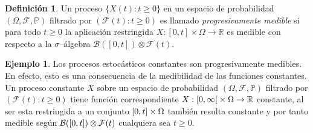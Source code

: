 \documentclass{report}
\newcommand{\leftOpenInterval}{\left]}
\newcommand{\rightOpenInterval}{\right[}
\newcommand{\leftClosedInterval}{\left[}
\newcommand{\rightClosedInterval}{\right]}
\newcommand{\interval}[3]{%
    \ifstrequal{#1}{oo}{%
      \leftOpenInterval #2, #3 \rightOpenInterval%
    }{%
      \ifstrequal{#1}{co}{%
        \leftClosedInterval #2, #3 \rightOpenInterval%
      }{%
        \ifstrequal{#1}{oc}{
          \leftOpenInterval #2, #3 \rightClosedInterval%
        }{%
          \ifstrequal{#1}{cc}{
            \leftClosedInterval #2, #3 \rightClosedInterval
          }{%
          }%
        }%
      }%
    }%
  }
\newcommand{\characteristic}{\mathbbm{1}}
\newcommand{\prob}{\mathbb{P}}
\newcommand{\events}{\mathcal{F}}
\newcommand{\borel}{\mathcal{B}}
\newcommand{\realNumbers}{\mathbb{R}}
\theoremstyle{plain}
\theoremstyle{remark}
\theoremstyle{definition}
\newtheorem{definition}{Definición}
\newtheorem{example}{Ejemplo}
\begin{document}
\begin{definition}
  Un proceso \(\{X(t) : t \geq 0\}\) en un espacio de probabilidad \((\Omega, \events, \prob)\) filtrado por \((\events(t) : t \geq 0)\) es llamado \emph{progresivamente medible} si para todo \(t \geq 0\) la aplicación restringida \(X : [0, t] \times \Omega \rightarrow \realNumbers\) es medible con respecto a la \(\sigma\)--álgebra \(\borel([0, t]) \otimes \events(t)\).
\end{definition}
\begin{example}
  Los procesos estocásticos constantes son progresivamente medibles.
  En efecto, esto es una consecuencia de la medibilidad de las funciones constantes.
  Un proceso constante \(X\) sobre un espacio de probabilidad \((\Omega, \events, \prob)\) filtrado por \((\events(t) : t \geq 0)\) tiene función correspondiente \(X : \interval{co}{0}{\infty} \times \Omega \rightarrow \realNumbers\) constante, al ser esta restringida a un conjunto \(\interval{cc}{0}{t} \times \Omega\) también resulta constante y por tanto medible según \(\borel(\interval{cc}{0}{t}) \otimes \events(t)\) cualquiera sea \(t \geq 0\).
\end{example}
\end{document}
